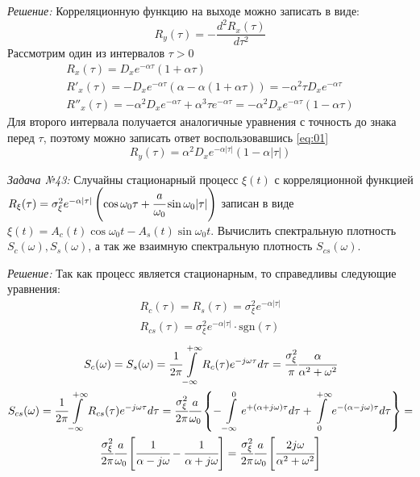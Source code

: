 \documentclass[14pt,final,titlepage,pscyr]{hedwork}
\begin{document}
\emph{Решение:} Корреляционную функцию на выходе можно записать в виде:
\begin{equation}
    R_y(\tau) = -\frac{d^2 R_x(\tau)}{d\tau^2}
    \label{eq:01}
\end{equation}
Рассмотрим один из интервалов \( \tau > 0 \)
\begin{gather}
    R_x(\tau) = D_x e^{-\alpha\tau}(1+\alpha\tau) \nonumber \\
    R'_x(\tau) = -D_x e^{-\alpha\tau}(\alpha-\alpha(1+\alpha\tau)) = 
    -\alpha^2\tau D_x e^{-\alpha\tau} \nonumber \\
    R''_x(\tau) = -\alpha^2 D_x e^{-\alpha\tau} + \alpha^3 \tau 
        e^{-\alpha\tau} = -\alpha^2 D_x e^{-\alpha\tau} ( 1 - \alpha\tau ) 
    \nonumber
\end{gather}
Для второго интервала получается аналогичные уравнения с точность до знака 
перед \( \tau \), поэтому можно записать ответ воспользовавшись \eqref{eq:01}
\[
    R_y(\tau) = \alpha^2 D_x e^{-\alpha|\tau|} ( 1 - \alpha|\tau| )
\]

\emph{Задача №43:} Случайны стационарный процесс \( \xi(t) \) с корреляционной 
функцией 
\( 
    R_\xi(\tau) = \sigma_\xi^2 e^{-\alpha|\tau|} \left( 
        \cos\omega_0\tau + \cfrac{a}{\omega_0}\sin\omega_0|\tau| 
    \right)
\) записан в виде \\ 
\( \xi(t) = A_c(t)\cos\omega_0 t - A_s(t)\sin\omega_0 t \). 
Вычислить спектральную плотность \( S_c(\omega), S_s(\omega) \), а так же 
взаимную спектральную плотность \( S_{cs}(\omega) \).

\emph{Решение:} Так как процесс является стационарным, то справедливы 
следующие уравнения:
\begin{gather}
    R_c(\tau) = R_s(\tau) = \sigma_\xi^2 e^{-\alpha|\tau|} \nonumber \\
    R_{cs}(\tau) = \sigma_\xi^2 e^{-\alpha|\tau|} \cdot 
        \mathrm{sgn}(\tau) \nonumber
\end{gather}
\begin{gather}
    S_c(\omega) = S_s(\omega) = \cfrac{1}{2\pi} \int\limits_{-\infty}^{+\infty}
        R_c(\tau) e^{-j\omega\tau} d\tau = \cfrac{\sigma_\xi^2}{\pi}
        \cfrac{\alpha}{\alpha^2 + \omega^2} \nonumber \\
    S_{cs}(\omega) = \cfrac{1}{2\pi} \int\limits_{-\infty}^{+\infty}
        R_{cs}(\tau) e^{-j\omega\tau} d\tau = \cfrac{\sigma_\xi^2}{2\pi}
        \cfrac{a}{\omega_0} \left\{ 
            -\int\limits_{-\infty}^{0} e^{+(\alpha+j\omega)\tau} d\tau
            +\int\limits_{0}^{+\infty} e^{-(\alpha-j\omega)\tau} d\tau
        \right\} = \nonumber \\
        \cfrac{\sigma_\xi^2}{2\pi}\cfrac{a}{\omega_0} \left[ 
            \cfrac{1}{\alpha-j\omega} - \cfrac{1}{\alpha+j\omega}
        \right] = \cfrac{\sigma_\xi^2}{2\pi}\cfrac{a}{\omega_0} \left[ 
            \cfrac{2j\omega}{\alpha^2 + \omega^2}
        \right] \nonumber
\end{gather}
\end{document}
